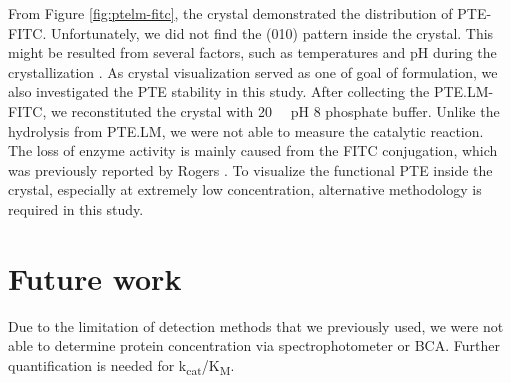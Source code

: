 \begin{refsection}
From Figure \ref{fig:ptelm-fitc}, the crystal demonstrated the distribution of
PTE-FITC. Unfortunately, we did not find the (010) pattern inside the crystal.
This might be resulted from several factors, such as temperatures and pH during
the crystallization \cite{Wong2014}. As crystal visualization served as one of
goal of formulation, we also investigated the PTE stability in this study.
After collecting the PTE.LM-FITC, we reconstituted the crystal with
\SI{20}{\milli\Molar} pH 8 phosphate buffer. Unlike the hydrolysis from PTE.LM,
we were not able to measure the catalytic reaction. The loss of enzyme activity
is mainly caused from the FITC conjugation, which was previously reported by
Rogers  \cite{Rogers1999}. To visualize the functional PTE inside
the crystal, especially at extremely low concentration, alternative methodology
is required in this study.

\section{Future work}

Due to the limitation of detection methods that we previously used, we were not
able to determine protein concentration via spectrophotometer or BCA. Further
quantification is needed for k\textsubscript{cat}/K\textsubscript{M}.

\printbibliography[heading=subbibliography]

\end{refsection}
